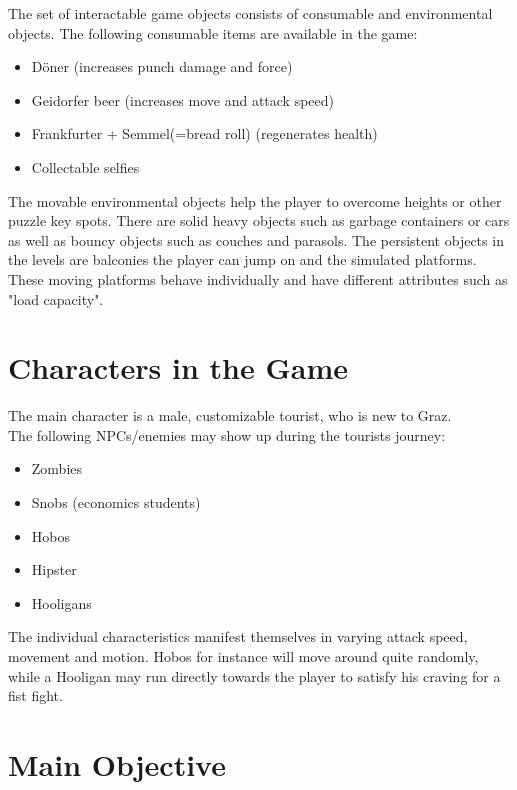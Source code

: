 \documentclass[a4paper]{scrreprt}
\begin{document}
The set of interactable game objects consists of consumable and environmental objects. The following consumable items are available in the game:

\begin{itemize}
\item Döner (increases punch damage and force)
\item Geidorfer beer (increases move and attack speed)
\item Frankfurter + Semmel(=bread roll) (regenerates health)
\item Collectable selfies
\end{itemize}

The movable environmental objects help the player to overcome heights or other puzzle key spots. There are solid heavy objects such as garbage containers or cars as well as bouncy objects such as couches and parasols. The persistent objects in the levels are balconies the player can jump on and the simulated platforms. These moving platforms behave individually and have different attributes such as "load capacity".



\section{Characters in the Game}

The main character is a male, customizable tourist, who is new to Graz.\\
The following NPCs/enemies may show up during the tourists journey:
\begin{itemize}
\item Zombies
\item Snobs (economics students)
\item Hobos
\item Hipster
\item Hooligans
\end{itemize}

The individual characteristics manifest themselves in varying attack speed, movement and motion. Hobos for instance will move around quite randomly, while a Hooligan may run directly towards the player to satisfy his craving for a fist fight.

\section{Main Objective}
\end{document}
